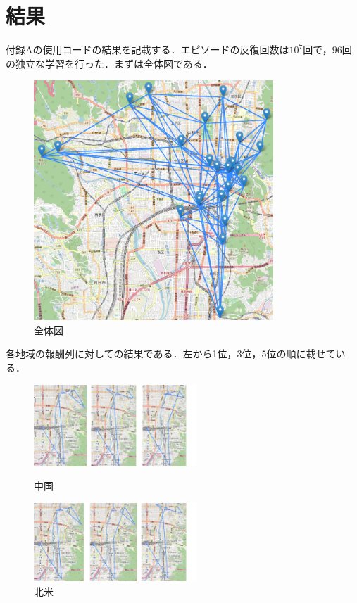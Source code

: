 \documentclass[a4paper,12pt]{jsreport}
\theoremstyle{definition}
\begin{document}
\section{結果}
付録Aの使用コードの結果を記載する．エピソードの反復回数は$10^7$回で，$96$回の独立な学習を行った．まずは全体図である．
\begin{figure}[h]
    \centering
    \includegraphics[width=9cm]{png/round.png}
    \caption{全体図}
    \label{fig:round}
\end{figure}
\newpage
各地域の報酬列に対しての結果である．左から1位，3位，5位の順に載せている．
\begin{figure}[htbp]
    \begin{minipage}{0.49\hsize}
        \begin{center}
            \includegraphics[width=61mm]{png/china.png}
        \end{center}
        \caption{中国}
        \label{fig:china}
    \end{minipage}
    \begin{minipage}{0.49\hsize}
        \begin{center}
            \includegraphics[width=61mm]{png/hokubei.png}
        \end{center}
        \caption{北米}
        \label{fig:hokubei}
    \end{minipage}
\end{figure}
\end{document}
